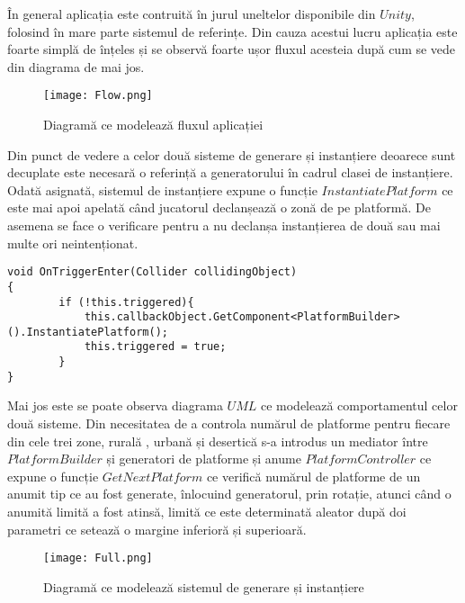 În general aplicația este contruită în jurul uneltelor disponibile din $Unity$, folosind în mare parte sistemul de referințe. Din cauza acestui lucru aplicația este foarte simplă de înțeles și se observă foarte ușor fluxul acesteia după cum se vede din diagrama de mai jos.\par

\begin{figure}[H]
\centering
\texttt{[image: Flow.png]} \par
\caption{Diagramă ce modelează fluxul aplicației}
\end{figure}

Din punct de vedere a celor două sisteme de generare și instanțiere deoarece sunt decuplate este necesară o referință a generatorului în cadrul clasei de instanțiere. Odată asignată, sistemul de instanțiere expune o funcție $InstantiatePlatform$ ce este mai apoi apelată când jucatorul declanșează o zonă de pe platformă. De asemena se face o verificare pentru a nu declanșa instanțierea de două sau mai multe ori neintenționat.\par

\begin{lstlisting}[caption=Apelul de instanțiere a unei platforme]
void OnTriggerEnter(Collider collidingObject)
{
        if (!this.triggered){
            this.callbackObject.GetComponent<PlatformBuilder>().InstantiatePlatform();
            this.triggered = true;
        }
}
\end{lstlisting}

Mai jos este se poate observa diagrama $UML$ ce modelează comportamentul celor două sisteme. Din necesitatea de a controla numărul de platforme pentru fiecare din cele trei zone, rurală , urbană și desertică s-a introdus un mediator între $PlatformBuilder$ și generatori de platforme și anume $PlatformController$ ce expune o funcție $GetNextPlatform$ ce verifică numărul de platforme de un anumit tip ce au fost generate, înlocuind generatorul, prin rotație, atunci când o anumită limită a fost atinsă, limită ce este determinată aleator după doi parametri ce setează o margine inferioră și superioară.\par

\vspace{10mm}
\begin{figure}[H]
\centering
\texttt{[image: Full.png]} \par
\caption{Diagramă ce modelează sistemul de generare și instanțiere}
\end{figure}
